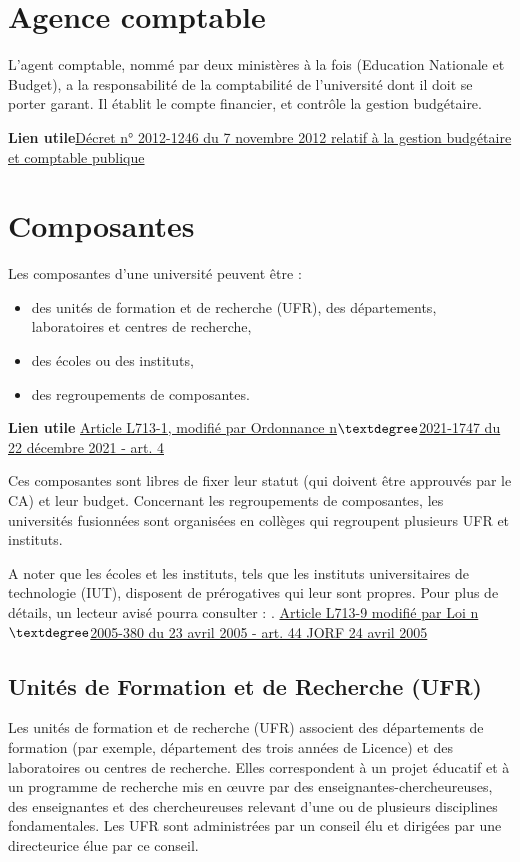\section{Agence comptable}
L'agent comptable, nomm\'e par deux minist\`eres \`a la fois (Education Nationale et Budget), a la responsabilit\'e de la comptabilit\'e de l'universit\'e dont il doit se porter garant. Il \'etablit le compte financier, et contr\^ole la gestion budg\'etaire.

\textbf{Lien utile\hspace{.5em}}\href{https://www.legifrance.gouv.fr/loda/id/JORFTEXT000026597003}{D\'ecret n° 2012-1246 du 7 novembre 2012 relatif \`a la gestion budg\'etaire et comptable publique}

\section{Composantes}
Les composantes d'une universit\'e peuvent \^etre :
\begin{itemize}
 \item des unit\'es de formation et de recherche (UFR), des d\'epartements, laboratoires et centres de recherche,
 \item des \'ecoles ou des instituts,
 \item des regroupements de composantes.
\end{itemize}
\textbf{Lien utile\hspace{.5em}}
\href{https://www.legifrance.gouv.fr/codes/id/LEGISCTA000006166682}{Article L713-1, modifi\'e par Ordonnance n$\textdegree$2021-1747 du 22 d\'ecembre 2021 - art. 4} 

Ces composantes sont libres de fixer leur statut (qui doivent \^etre approuv\'es par le CA) et leur budget. 
Concernant les regroupements de composantes, les universit\'es fusionn\'ees sont organis\'ees en coll\`eges qui regroupent plusieurs UFR et instituts. 

A noter que les \'ecoles et les instituts, tels que les instituts universitaires de technologie (IUT), 
disposent de pr\'erogatives qui leur sont propres. Pour plus de d\'etails, un lecteur avis\'e pourra consulter :
.
\href{https://www.legifrance.gouv.fr/codes/id/LEGISCTA000006182446}{Article L713-9 modifi\'e par Loi n$\textdegree$2005-380 du 23 avril 2005 - art. 44 JORF 24 avril 2005}

\subsection{Unit\'es de Formation et de Recherche (UFR)}
Les unit\'es de formation et de recherche (UFR) associent des d\'epartements de formation (par exemple, d\'epartement des trois ann\'ees de Licence) et des laboratoires ou centres de recherche. Elles correspondent \`a un projet \'educatif et \`a un programme de recherche mis en \oe uvre par des enseignant\mp e\mp s-chercheur\mp euse\mp s, des enseignant\mp e\mp s et des chercheur\mp euse\mp s relevant d'une ou de plusieurs disciplines fondamentales. Les UFR sont administr\'ees par un conseil \'elu et dirig\'ees par un\mp e directeur\mp ice \'elu\mp e par ce conseil.

